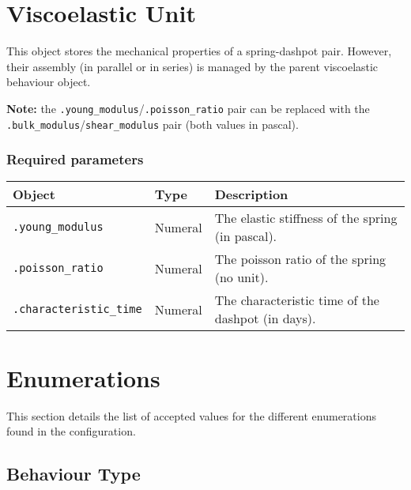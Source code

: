 \documentclass[10pt]{article}
\begin{document}
\section{Viscoelastic Unit}

This object stores the mechanical properties of a spring-dashpot pair. However, their assembly (in parallel or in series) is managed by the parent viscoelastic behaviour object.

\textbf{Note:} the \verb+.young_modulus+/\verb+.poisson_ratio+ pair can be replaced with the \verb+.bulk_modulus+/\verb+shear_modulus+ pair (both values in pascal).

\subsubsection*{Required parameters}

\begin{tabularx}{\textwidth}{llX}
\hline 
Object & Type & Description \\ 
\hline 
\verb+.young_modulus+ & Numeral & The elastic stiffness of the spring (in pascal).\\
\verb+.poisson_ratio+ & Numeral & The poisson ratio of the spring (no unit).\\
\verb+.characteristic_time+ & Numeral & The characteristic time of the dashpot (in days).\\
\hline 
\end{tabularx}






\section{Enumerations}

This section details the list of accepted values for the different enumerations found in the configuration.

\subsection{Behaviour Type}
\end{document}
